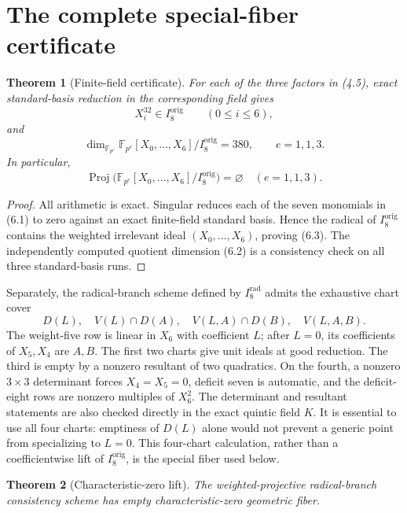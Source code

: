 \documentclass[11pt]{article}
\newtheorem{theorem}{Theorem}[section]
\theoremstyle{definition}
\theoremstyle{remark}
\newcommand{\F}{\mathbb F}
\newcommand{\Proj}{\operatorname{Proj}}
\begin{document}
\section{The complete special-fiber certificate}\label{sec:certificate}

\begin{theorem}[Finite-field certificate]\label{thm:finite}
For each of the three factors in (4.5), exact standard-basis reduction in
the corresponding field gives
\[
   X_i^{32}\in I_8^{\mathrm{orig}}\qquad(0\le i\le6),  \tag{6.1}
\]
and
\[
   \dim_{\F_{p^e}}
   \F_{p^e}[X_0,\ldots,X_6]/I_8^{\mathrm{orig}}=380,
   \qquad e=1,1,3.                                     \tag{6.2}
\]
In particular,
\[
 \Proj\bigl(
 \F_{p^e}[X_0,\ldots,X_6]/I_8^{\mathrm{orig}}
 \bigr)=\varnothing
 \quad(e=1,1,3).                                       \tag{6.3}
\]
\end{theorem}

\begin{proof}
All arithmetic is exact.  Singular reduces each of the seven monomials
in (6.1) to zero against an exact finite-field standard basis.  Hence the
radical of \(I_8^{\mathrm{orig}}\) contains the weighted irrelevant ideal
\((X_0,\ldots,X_6)\), proving (6.3).  The independently computed quotient
dimension (6.2) is a consistency check on all three standard-basis runs.
\end{proof}

Separately, the radical-branch scheme defined by
\(I_8^{\mathrm{rad}}\) admits the exhaustive chart cover
\[
D(L),\quad V(L)\cap D(A),\quad
V(L,A)\cap D(B),\quad V(L,A,B).                         \tag{6.4}
\]
The weight-five row is linear in \(X_6\) with coefficient \(L\); after
\(L=0\), its coefficients of \(X_5,X_4\) are \(A,B\).  The first two
charts give unit ideals at good reduction.  The third is empty by a
nonzero resultant of two quadratics.  On the fourth, a nonzero
\(3\times3\) determinant forces \(X_4=X_5=0\), deficit seven is automatic,
and the deficit-eight rows are nonzero multiples of \(X_6^2\).
The determinant and resultant statements are also checked directly in
the exact quintic field \(K\).  It is essential to use all four charts:
emptiness of \(D(L)\) alone would not prevent a generic point from
specializing to \(L=0\).  This four-chart calculation, rather than a
coefficientwise lift of \(I_8^{\mathrm{orig}}\), is the special fiber
used below.

\begin{theorem}[Characteristic-zero lift]\label{thm:lift}
The weighted-projective radical-branch consistency scheme has empty
characteristic-zero geometric fiber.
\end{theorem}
\end{document}

